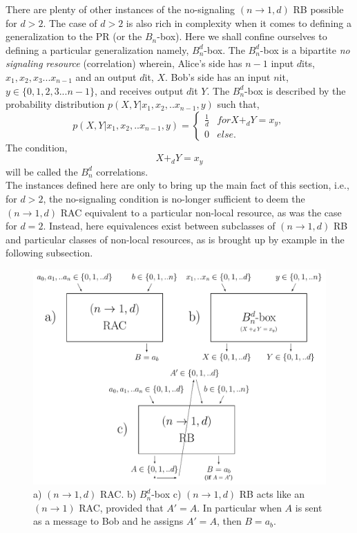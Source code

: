 \documentclass[%
 reprint,
 amsmath,amssymb,
 aps,
]{revtex4-1}
\begin{document}
There are plenty of other instances of the no-signaling $(n \rightarrow 1,d)$ RB possible for $d>2$. The case of $d>2$ is also rich in complexity when it comes to defining a generalization to the PR (or the $B_n$-box). Here we shall confine ourselves to defining a particular generalization namely, $B_n^d$-box. The $B_n^d$-box is a bipartite \textit{no signaling} \textit{resource} (correlation) wherein, Alice's side has $n-1$ input $d$its, $x_{1},x_{2},x_{3}...x_{n-1}$ and an output $d$it, $X$. Bob's side has an input $n$it, $y\in\{0,1,2,3...n-1\}$, and receives output $d$it $Y$. 
The $B_n^d$-box is described by the probability distribution $p(X,Y|x_1,x_2,..x_{n-1},y)$ such that, \\ 
\begin{equation}
p(X,Y|x_1,x_2,..x_{n-1},y)=
\begin{cases}
\frac{1}{d} & for X+_d Y=x_y,\\
0 & else.
\end{cases}
\end{equation}
The condition,
\begin{equation} \label{Bndcorr}
X+_d Y=x_y
\end{equation}
will be called the $B_n^d$ correlations.\\ 
The instances defined here are only to bring up the main fact of this section, i.e., for $d>2$, the no-signaling condition is no-longer sufficient to deem the  $(n \rightarrow 1,d)$ RAC  equivalent to a particular non-local resource, as was the case for $d=2$. Instead, here equivalences exist between subclasses of $(n \rightarrow 1,d)$ RB and particular classes of non-local resources, as is brought up by example in the following subsection. \\
\begin{figure}
\includegraphics[scale=0.5]{Def2.pdf}
\caption{  \label{Def2} a) $(n\rightarrow 1,d)$ RAC. b) $B_n^d$-box c) $(n\rightarrow 1,d)$ RB acts like an $(n\rightarrow 1)$ RAC, provided that $A'=A$. In particular when $A$ is sent as a message to Bob and he assigns $A'=A$, then $B=a_b$. }
\end{figure}
\end{document}
